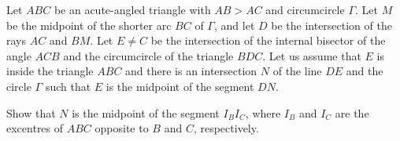 Let $ABC$ be an acute-angled triangle with $AB > AC$ and circumcircle $\Gamma$. Let $M$ be the midpoint of the shorter arc $BC$ of $\Gamma$,  and let $D$ be the intersection of the rays $AC$ and $BM$. Let $E \neq C$ be the intersection of the internal bisector of the angle $ACB$ and the circumcircle of the triangle $BDC$. Let us assume that $E$ is inside the triangle $ABC$ and there is an intersection $N$ of the line $DE$ and the circle $\Gamma$ such that $E$ is the midpoint of the segment $DN$.

Show that $N$ is the midpoint of the segment $I_B I_C$,  where $I_B$ and $I_C$ are the excentres of $ABC$ opposite to $B$ and $C$,  respectively.